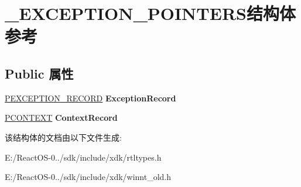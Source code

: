 \hypertarget{struct___e_x_c_e_p_t_i_o_n___p_o_i_n_t_e_r_s}{}\section{\+\_\+\+E\+X\+C\+E\+P\+T\+I\+O\+N\+\_\+\+P\+O\+I\+N\+T\+E\+R\+S结构体 参考}
\label{struct___e_x_c_e_p_t_i_o_n___p_o_i_n_t_e_r_s}
\subsection*{Public 属性}
\begin{DoxyCompactItemize}
\item 
\mbox{\label{struct___e_x_c_e_p_t_i_o_n___p_o_i_n_t_e_r_s_a39e61752a6d70120e1785e59135dc04a}} 
\hyperlink{struct___e_x_c_e_p_t_i_o_n___r_e_c_o_r_d}{P\+E\+X\+C\+E\+P\+T\+I\+O\+N\+\_\+\+R\+E\+C\+O\+RD} {\bfseries Exception\+Record}
\item 
\mbox{\label{struct___e_x_c_e_p_t_i_o_n___p_o_i_n_t_e_r_s_aba97c874dfacb55729dabc7ac0e80e47}} 
\hyperlink{struct___c_o_n_t_e_x_t}{P\+C\+O\+N\+T\+E\+XT} {\bfseries Context\+Record}
\end{DoxyCompactItemize}


该结构体的文档由以下文件生成\+:\begin{DoxyCompactItemize}
\item 
E\+:/\+React\+O\+S-\/0../sdk/include/xdk/rtltypes.\+h\item 
E\+:/\+React\+O\+S-\/0../sdk/include/xdk/winnt\+\_\+old.\+h\end{DoxyCompactItemize}
